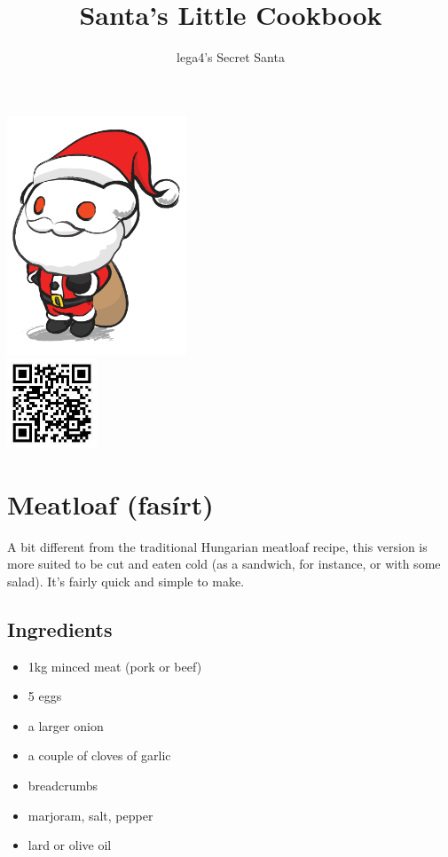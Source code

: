 \documentclass{article}
\title{Santa's Little Cookbook}
\author{lega4's Secret Santa}
\begin{document}
\maketitle
\thispagestyle{empty}

\begin{center}
\vspace{2cm}
\includegraphics[width=0.4\textwidth]{logo}
\\
\vspace{1cm}
\includegraphics[width=0.2\textwidth]{qr}

\end{center}


\newpage
\section{Meatloaf (fasírt)}

A bit different from the traditional Hungarian meatloaf recipe, this version is more suited to be cut and eaten cold (as a sandwich, for instance, or with some salad). It's fairly quick and simple to make. 

\subsection{Ingredients}
\begin{itemize}
    \item 1kg minced meat (pork or beef)
    \item 5 eggs
    \item a larger onion
    \item a couple of cloves of garlic
    \item breadcrumbs
    \item marjoram, salt, pepper
    \item lard or olive oil
\end{itemize}
\end{document}
